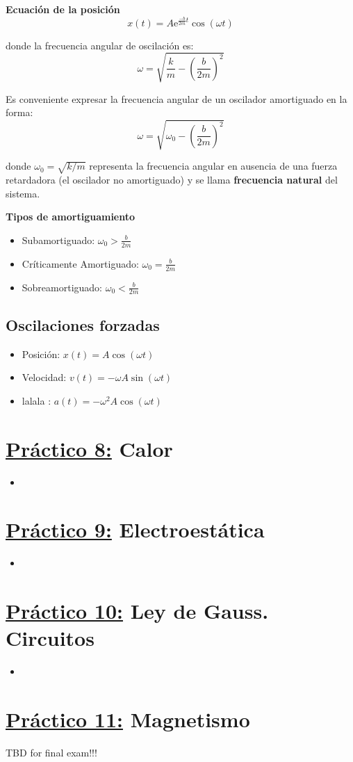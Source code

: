 \documentclass[12pt,a4paper]{article}
\newcommand{\PN}{\par\noindent}
\begin{document}
		\PN \textbf{Ecuación de la posición}
		\begin{equation}
			x(t) = A \mathrm{e}^{\frac{-b}{2m}t} \cos (\omega t)
		\end{equation}

		\PN donde la frecuencia angular de oscilación es:
		\begin{equation}
			\omega = \sqrt{\frac{k}{m} - \left(\frac{b}{2m}\right)^{2}}
		\end{equation}

		\PN Es conveniente expresar la frecuencia angular de un oscilador amortiguado en la forma:
		\begin{equation}
			\omega = \sqrt{\omega_{0} - \left(\frac{b}{2m}\right)^{2}}
		\end{equation}

		\PN donde $\omega_{0} = \sqrt{k/m}$ representa la frecuencia angular en ausencia de una fuerza retardadora (el
		oscilador no amortiguado) y se llama \textbf{frecuencia natural} del sistema.

		\pagebreak
		\PN \textbf{Tipos de amortiguamiento}
		\begin{itemize}
			\item Subamortiguado: $\omega_{0} > \frac{b}{2m}$
			\item Críticamente Amortiguado: $\omega_{0} = \frac{b}{2m}$
			\item Sobreamortiguado: $\omega_{0} < \frac{b}{2m}$
		\end{itemize}

	\subsection{Oscilaciones forzadas}
		\begin{itemize}
			\item Posición: $x(t) = A \cos (\omega t)$
			\item Velocidad: $v(t) = - \omega A \sin (\omega t)$
			\item lalala	: $a(t) = - \omega^{2} A \cos (\omega t)$
		\end{itemize}

	\section*{\underline{Práctico 8:} Calor}
		\begin{itemize}
			\item
		\end{itemize}

	\section*{\underline{Práctico 9:} Electroestática}
		\begin{itemize}
			\item
		\end{itemize}

	\section*{\underline{Práctico 10:} Ley de Gauss. Circuitos}
		\begin{itemize}
			\item
		\end{itemize}

	\section*{\underline{Práctico 11:} Magnetismo}
		TBD for final exam!!!
\end{document}
